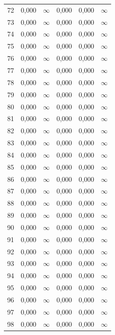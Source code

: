 \begin{tabular}{l c c c c c}
72 & 0,000 & $\infty$ & 0,000 & 0,000 & $\infty$ \\
73 & 0,000 & $\infty$ & 0,000 & 0,000 & $\infty$ \\
74 & 0,000 & $\infty$ & 0,000 & 0,000 & $\infty$ \\
75 & 0,000 & $\infty$ & 0,000 & 0,000 & $\infty$ \\
76 & 0,000 & $\infty$ & 0,000 & 0,000 & $\infty$ \\
77 & 0,000 & $\infty$ & 0,000 & 0,000 & $\infty$ \\
78 & 0,000 & $\infty$ & 0,000 & 0,000 & $\infty$ \\
79 & 0,000 & $\infty$ & 0,000 & 0,000 & $\infty$ \\
80 & 0,000 & $\infty$ & 0,000 & 0,000 & $\infty$ \\
81 & 0,000 & $\infty$ & 0,000 & 0,000 & $\infty$ \\
82 & 0,000 & $\infty$ & 0,000 & 0,000 & $\infty$ \\
83 & 0,000 & $\infty$ & 0,000 & 0,000 & $\infty$ \\
84 & 0,000 & $\infty$ & 0,000 & 0,000 & $\infty$ \\
85 & 0,000 & $\infty$ & 0,000 & 0,000 & $\infty$ \\
86 & 0,000 & $\infty$ & 0,000 & 0,000 & $\infty$ \\
87 & 0,000 & $\infty$ & 0,000 & 0,000 & $\infty$ \\
88 & 0,000 & $\infty$ & 0,000 & 0,000 & $\infty$ \\
89 & 0,000 & $\infty$ & 0,000 & 0,000 & $\infty$ \\
90 & 0,000 & $\infty$ & 0,000 & 0,000 & $\infty$ \\
91 & 0,000 & $\infty$ & 0,000 & 0,000 & $\infty$ \\
92 & 0,000 & $\infty$ & 0,000 & 0,000 & $\infty$ \\
93 & 0,000 & $\infty$ & 0,000 & 0,000 & $\infty$ \\
94 & 0,000 & $\infty$ & 0,000 & 0,000 & $\infty$ \\
95 & 0,000 & $\infty$ & 0,000 & 0,000 & $\infty$ \\
96 & 0,000 & $\infty$ & 0,000 & 0,000 & $\infty$ \\
97 & 0,000 & $\infty$ & 0,000 & 0,000 & $\infty$ \\
98 & 0,000 & $\infty$ & 0,000 & 0,000 & $\infty$ \\
\hline 
 \end{tabular}

